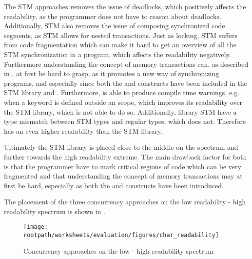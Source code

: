 The \ac{STM} approaches removes the issue of deadlocks, which positively affects the readability, as the programmer does not have to reason about deadlocks. Additionally, \ac{STM} also removes the issue of composing synchronized code segments, as \ac{STM} allows for nested transactions. Just as locking, \ac{STM} suffers from code fragmentation which can make it hard to get an overview of all the \ac{STM} synchronization in a program, which affects the readability negatively. Furthermore understanding the concept of memory transactions can, as described in \cite{rossbach2010transactional}, at first be hard to grasp, as it promotes a new way of synchronizing programs, and especially since both the  and  constructs have been included in the \ac{STM} library and \stmname. Furthermore, \stmname is able to produce compile time warnings, e.g. when a  keyword is defined outside an  scope, which improves its readability over the \ac{STM} library, which is not able to do so. Additionally, library \ac{STM} have a type mismatch between \ac{STM} types and regular types, which \stmname does not. Therefore \stmname has an even higher readability than the \ac{STM} library.

Ultimately the \ac{STM} library is placed close to the middle on the spectrum and \stmname further towards the high readability extreme. The main drawback factor for both is that the programmer have to mark critical regions of code which can be very fragmented and that understanding the concept of memory transactions may at first be hard, especially as both the  and  constructs have been introduced.

The placement of the three concurrency approaches on the low readability - high readability spectrum is shown in .

\begin{figure}[htbp]
\centering
 \texttt{[image: \\rootpath/worksheets/evaluation/figures/char\_readability]} 
 \caption{Concurrency approaches on the low - high readability spectrum}
\label{fig:char_readability}
\end{figure}

